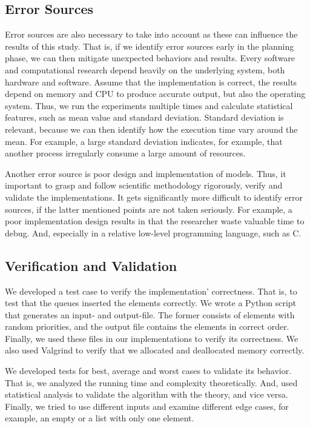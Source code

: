 \documentclass[a4paper,11pt]{kth-mag}
\newcommand*{\skippara}{\par\vspace{\baselineskip} \noindent}
\begin{document}
\subsection{Error Sources} Error sources are also necessary to take into account as these can influence the results of this study.
That is, if we identify error sources early in the planning phase, we can then mitigate unexpected behaviors and results.
Every software and computational research depend heavily on the underlying system, both hardware and software.
Assume that the implementation is correct, the results depend on memory and CPU to produce accurate output, but also the operating system.
Thus, we run the experiments multiple times and calculate statistical features, such as mean value and standard deviation.
Standard deviation is relevant, because we can then identify how the execution time vary around the mean.
For example, a large standard deviation indicates, for example, that another process irregularly consume a large amount of resources.

\skippara Another error source is poor design and implementation of models.
Thus, it important to grasp and follow scientific methodology rigorously, verify and validate the implementations.
It gets significantly more difficult to identify error sources, if the latter mentioned points are not taken seriously.
For example, a poor implementation design results in that the researcher waste valuable time to debug.
And, especially in a relative low-level programming language, such as C.

\subsection{Verification and Validation}
We developed a test case to verify the implementation' correctness.
That is, to test that the queues inserted the elements correctly.
We wrote a Python script that generates an input- and output-file.
The former consists of elements with random priorities, and the output file contains the elements in correct order.
Finally, we used these files in our implementations to verify its correctness.
We also used Valgrind to verify that we allocated and deallocated memory correctly.

\skippara
We developed tests for best, average and worst cases to validate its behavior.
That is, we analyzed the running time and complexity theoretically.
And, used statistical analysis to validate the algorithm with the theory, and vice versa.
Finally, we tried to use different inputs and examine different edge cases, for example, an empty or a list with only one element.
\end{document}

